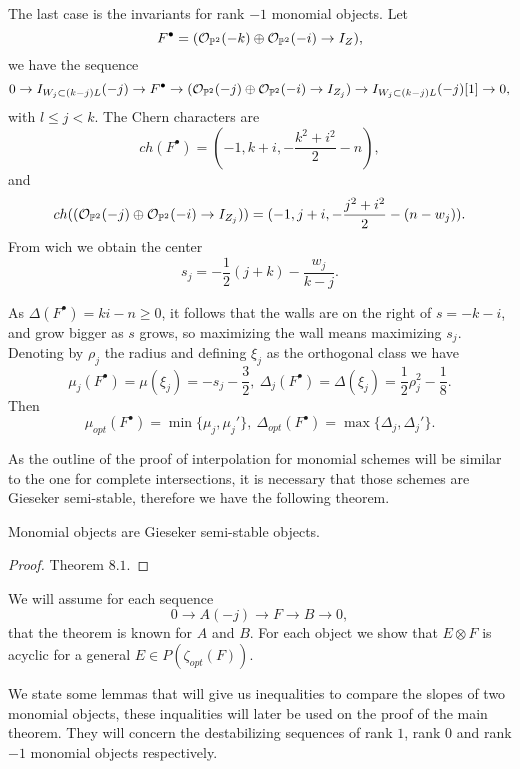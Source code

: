 \documentclass[
	oldfontcommands,
	sumario=abnt-6027-2012,
	12pt,			%
	openright,		%
	oneside,		%
	a4paper,		%
	english,		%
	brazil			%
	]{imecc-unicamp}
\begin{document}
The last case is the invariants for rank $-1$ monomial objects. Let 
$$
F^\bullet=({\mathcal O}_{{\mathbb P}^2}(-k)\oplus{\mathcal O}_{{\mathbb P}^2}(-i)\rightarrow I_{Z}),
$$
we have the sequence $$
0\rightarrow I_{W_j\subset(k-j)L}(-j)\rightarrow F^\bullet\rightarrow ({\mathcal O}_{{\mathbb P}^2}(-j)\oplus{\mathcal O}_{{\mathbb P}^2}(-i)\rightarrow I_{Z_j})\rightarrow I_{W_j\subset(k-j)L}(-j)[1]\rightarrow 0,
$$
with $l\le j< k$. The Chern characters are $$ch(F^\bullet)=(-1,k+i,-\frac{k^2+i^2}{2}-n),$$ and $$ch(({\mathcal O}_{{\mathbb P}^2}(-j)\oplus{\mathcal O}_{{\mathbb P}^2}(-i)\rightarrow I_{Z_j}))=(-1,j+i,-\frac{j^2+i^2}{2}-(n-w_j)).$$ From wich we obtain the center
$$
s_j=-\frac{1}{2}(j+k)-\frac{w_j}{k-j}.
$$ 

As $\Delta(F^\bullet)=ki-n\geq0$, it follows that the walls are on the right of $s=-k-i$, and grow bigger as $s$ grows, so maximizing the wall means maximizing $s_j$. Denoting by $\rho_j$ the radius and defining $\xi_j$ as the orthogonal class we have $$
\mu_j(F^\bullet)=\mu(\xi_j)=-s_j-\frac{3}{2},~\Delta_j(F^\bullet)=\Delta(\xi_j)=\frac{1}{2}\rho^2_j-\frac{1}{8}.
$$
Then $$
\mu_{opt}(F^\bullet)=\min\{\mu_j,\mu_j'\}, ~
\Delta_{opt}(F^\bullet)=\max\{\Delta_j,\Delta_j' \}.
$$

As the outline of the proof of interpolation for monomial schemes will be similar to the one for complete intersections, it is necessary that those schemes are Gieseker semi-stable, therefore we have the following theorem.

\begin{teorema}
	Monomial objects are Gieseker semi-stable objects.
\end{teorema}
\begin{proof}
	\cite{COSKUN} Theorem $8.1$.
\end{proof}

We will assume for each sequence $$ 0\rightarrow A(-j)\rightarrow F\rightarrow B\rightarrow 0,
$$
that the theorem is known for $A$ and $B$. For each object we show that $E\otimes F$ is acyclic for a general $E\in P(\zeta_{opt}(F))$.

We state some lemmas that will give us inequalities to compare the slopes of two monomial objects, these inqualities will later be used on the proof of the main theorem. They will concern the destabilizing sequences of rank $1$, rank $0$ and rank $-1$ monomial objects respectively.  
\end{document}

